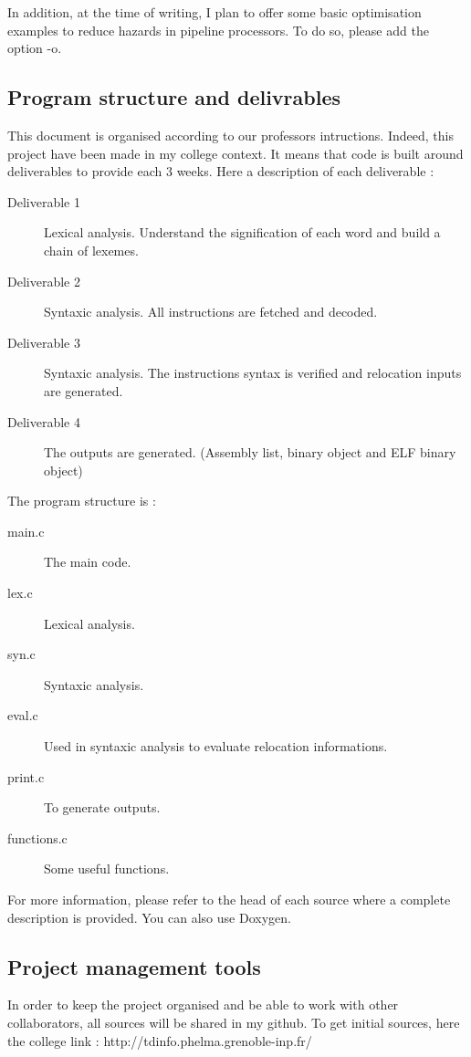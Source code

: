 \documentclass[twoside,twocolumn]{article}
\begin{document}
In addition, at the time of writing, I plan to offer some basic optimisation examples to reduce hazards in pipeline processors. To do so, please add the option -o.

\subsection{Program structure and delivrables}

This document is organised according to our professors intructions. Indeed, this project have been made in my college context. It means that code is built around deliverables to provide each 3 weeks. Here a description of each deliverable :

\begin{description}
 \item[ Deliverable 1 ] Lexical analysis. Understand the signification of each word and build a chain of lexemes.
 \item[ Deliverable 2 ] Syntaxic analysis. All instructions are fetched and decoded.
 \item[ Deliverable 3 ] Syntaxic analysis. The instructions syntax is verified and relocation inputs are generated.
 \item[ Deliverable 4 ] The outputs are generated. (Assembly list, binary object and ELF binary object)
\end{description}

The program structure is :
\begin{description}
 \item [ main.c ] The main code.
 \item [ lex.c ] Lexical analysis.
 \item [ syn.c ] Syntaxic analysis.
 \item [ eval.c ] Used in syntaxic analysis to evaluate relocation informations.
 \item [ print.c ] To generate outputs.
 \item [ functions.c ] Some useful functions.
\end{description}

For more information, please refer to the head of each source where a complete description is provided. You can also use Doxygen.



\subsection{Project management tools}
In order to keep the project organised and be able to work with other collaborators, all sources will be shared in my github. To get initial sources, here the college link : http://tdinfo.phelma.grenoble-inp.fr/
\end{document}
